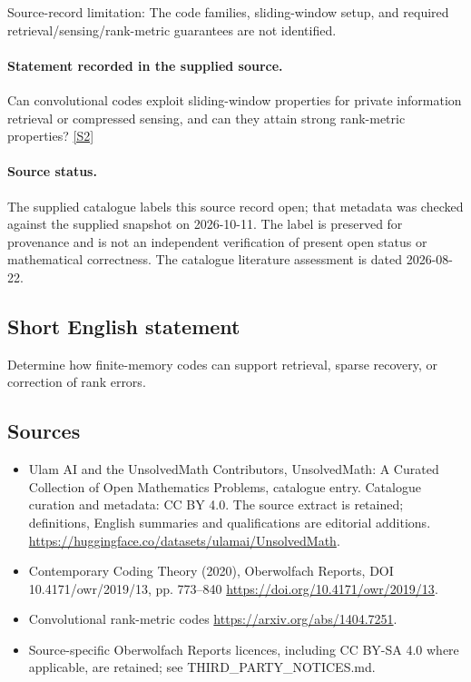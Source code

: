 \documentclass[11pt]{article}
\begin{document}
Source-record limitation: The code families, sliding-window setup, and required retrieval/sensing/rank-metric guarantees are not identified.
\paragraph{Statement recorded in the supplied source.}
Can convolutional codes exploit sliding-window properties for private information retrieval or compressed sensing, and can they attain strong rank-metric properties? \href{https://doi.org/10.4171/owr/2019/13}{[S2]}
\paragraph{Source status.}
The supplied catalogue labels this source record open; that metadata was checked against the supplied snapshot on 2026-10-11. The label is preserved for provenance and is not an independent verification of present open status or mathematical correctness. The catalogue literature assessment is dated 2026-08-22.
\subsection{Short English statement}
Determine how finite-memory codes can support retrieval, sparse recovery, or correction of rank errors.
\subsection{Sources}
\begin{itemize}
\item[S1] Ulam AI and the UnsolvedMath Contributors, UnsolvedMath: A Curated Collection of Open Mathematics Problems, catalogue entry. Catalogue curation and metadata: CC BY 4.0. The source extract is retained; definitions, English summaries and qualifications are editorial additions.
\url{https://huggingface.co/datasets/ulamai/UnsolvedMath}.
\item[S2] Contemporary Coding Theory (2020), Oberwolfach Reports, DOI 10.4171/owr/2019/13, pp. 773--840
\url{https://doi.org/10.4171/owr/2019/13}.
\item[S3] Convolutional rank-metric codes
\url{https://arxiv.org/abs/1404.7251}.
\item Source-specific Oberwolfach Reports licences, including CC BY-SA 4.0 where applicable, are retained; see THIRD\_PARTY\_NOTICES.md.
\end{itemize}
\end{document}
